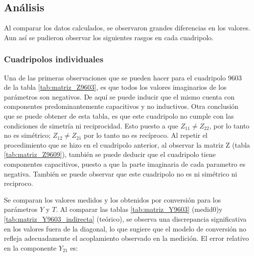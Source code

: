 \subsection{Análisis}

Al comparar los datos calculados, se observaron grandes diferencias en los valores. Aun así se pudieron observar los siguientes rasgos en cada cuadripolo.

\subsubsection{Cuadripolos individuales}


Una de las primeras observaciones que se pueden hacer para el cuadripolo 9603 de la tabla \ref{tab:matriz_Z9603}, es que todos los valores imaginarios de los parámetros son negativos. De aquí se puede inducir que el mismo cuenta con componentes predominantemente capacitivos y no inductivos. Otra conclusión que se puede obtener de esta tabla, es que este cuadripolo no cumple con las condiciones de simetría ni reciprocidad. Esto puesto a que $Z_{11} \neq Z_{22}$, por lo tanto no es simétrico; $Z_{12} \neq Z_{21}$ por lo tanto no es recíproco.
Al repetir el procedimiento que se hizo en el cuadripolo anterior, al observar la matriz Z (tabla \ref{tab:matriz_Z9609}), también se puede deducir que el cuadripolo tiene componentes capacitivos, puesto a que la parte imaginaria de cada parametro es negativa. También se puede observar que este cuadripolo no es ni simétrico ni reciproco. 

Se comparan los valores medidos y los obtenidos por conversión para los parámetros $Y$ y $T$. Al comparar las tablas \ref{tab:matriz_Y9603} (medid0)y \ref{tab:matriz_Y9603_indirecta} (teórico), se observa una discrepancia significativa en los valores fuera de la diagonal, lo que sugiere que el modelo de conversión no refleja adecuadamente el acoplamiento observado en la medición. El error relativo en la componente $Y_{21}$ es:








